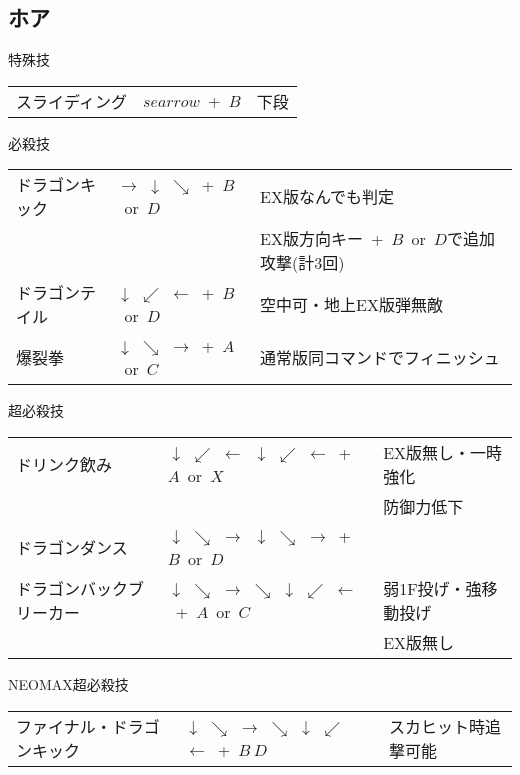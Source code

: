 \documentclass[a4j,11pt]{jarticle}
\def\hado{$\downarrow$ $\searrow$ $\rightarrow$}%
\def\tatsu{$\downarrow$ $\swarrow$ $\leftarrow$}%
\def\syoryu{$\rightarrow$ $\downarrow$ $\searrow$}%
\def\ryuko{$\downarrow$ $\searrow$ $\rightarrow$ $\searrow$ $\downarrow$ $\swarrow$ $\leftarrow$}%
\begin{document}
\subsection{ホア}
\begin{itembox}[l]{特殊技}
\begin{tabular}{lll}
スライディング&$searrow$\ +\ $B$&下段%
\end{tabular}
\end{itembox}
\begin{itembox}[l]{必殺技}
\begin{tabular}{lll}
ドラゴンキック&\syoryu\ +\ $B$\ or\ $D$&EX版なんでも判定\\%
&&EX版方向キー\ +\ $B$\ or\ $D$で追加攻撃(計3回)\\
ドラゴンテイル&\tatsu\ +\ $B$\ or\ $D$&空中可・地上EX版弾無敵\\%
爆裂拳&\hado\ +\ $A$\ or\ $C$&通常版同コマンドでフィニッシュ\\%
\end{tabular}
\end{itembox}
\begin{itembox}[l]{超必殺技}
\begin{tabular}{lll}
ドリンク飲み&\tatsu\ \tatsu\ +\ $A$\ or\ $X$&EX版無し・一時強化\\
&&防御力低下\\%
ドラゴンダンス&\hado\ \hado\ +\ $B$\ or\ $D$&\\%
ドラゴンバックブリーカー&\ryuko\ +\ $A$\ or\ $C$&弱1F投げ・強移動投げ\\%
&&EX版無し
\end{tabular}
\end{itembox}
\begin{itembox}[l]{NEOMAX超必殺技}
\begin{tabular}{lll}
ファイナル・ドラゴンキック&\ryuko\ +\ $B\ D$&スカヒット時追撃可能%
\end{tabular}
\end{itembox}
\newpage
\end{document}
